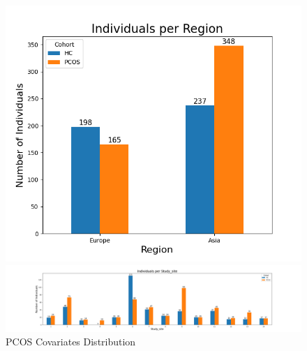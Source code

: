 \documentclass[12pt,letterpaper]{article}
\begin{document}
\begin{figure}[h!]
\begin{minipage}{0.2\linewidth}
  \centering
  \includegraphics[width=\linewidth]{../plots/pcos/region_bar_chart.png}
\end{minipage}%
\begin{minipage}{0.8\linewidth}
   \centering
   \includegraphics[width=\linewidth]{../plots/pcos/study_site_bar_chart.png}
\end{minipage}
\caption{PCOS Covariates Distribution}
\label{fig:pcoscovariates}
\end{figure}
\end{document}
